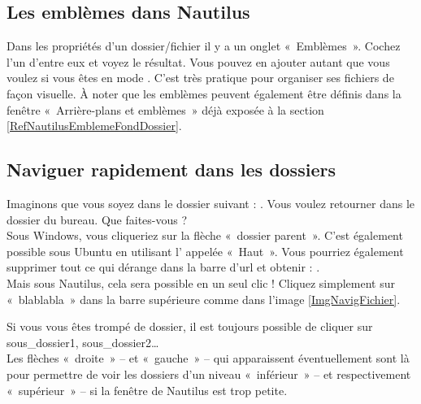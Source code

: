 \subsection{Les emblèmes dans Nautilus}
Dans les propriétés d'un dossier/fichier il y a un onglet «~Emblèmes~». Cochez l'un d'entre eux et voyez le résultat. Vous pouvez en ajouter autant que vous voulez si vous êtes en mode . C'est très pratique pour organiser ses fichiers de façon visuelle. À noter que les emblèmes peuvent également être définis dans la fenêtre «~Arrière-plans et emblèmes~» déjà exposée à la section \ref{RefNautilusEmblemeFondDossier}.
\subsection{Naviguer rapidement dans les dossiers}
Imaginons que vous soyez dans le dossier suivant : . Vous voulez retourner dans le dossier  du bureau. Que faites-vous ? \\
Sous Windows, vous cliqueriez sur la flèche «~dossier parent~». C'est également possible sous Ubuntu en utilisant l' appelée «~Haut~». Vous pourriez également supprimer tout ce qui dérange dans la barre d'url et obtenir : .\\
Mais sous Nautilus, cela sera possible en un seul clic ! Cliquez simplement sur «~blablabla~» dans la barre supérieure comme dans l'image \ref{ImgNavigFichier}.\par
{}
Si vous vous êtes trompé de dossier, il est toujours possible de cliquer sur sous\_dossier1, sous\_dossier2\ldots{}\\
Les flèches «~droite~» -- et «~gauche~» -- qui apparaissent éventuellement sont là pour permettre de voir les dossiers d'un niveau «~inférieur~» -- et respectivement «~supérieur~» -- si la fenêtre de Nautilus est trop petite.\par
{}
